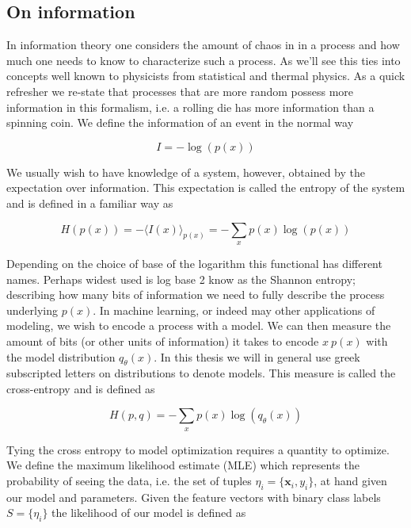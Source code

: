 \subsection{On information}\label{sec:information}

In information theory one considers the amount of chaos in in a process and how much one needs to know to characterize such a process. As we'll see this ties into concepts well known to physicists from statistical and thermal physics. As a quick refresher we re-state that processes that are more random possess more information in this formalism, i.e. a rolling die has more information than a spinning coin. We define the information of an event in the normal way 

\begin{equation}
I = -\log(p(x))
\end{equation} 

\noindent We usually wish to have knowledge of a system, however, obtained by the expectation over information. This expectation is called the entropy of the system and is defined in a familiar way as 

\begin{equation}
H(p(x)) = -\langle I(x) \rangle_{p(x)} = - \sum _x p(x)\log(p(x))
\end{equation}

\noindent Depending on the choice of base of the logarithm this functional has different names. Perhaps widest used is log base 2 know as the Shannon entropy; describing how many bits of information we need to fully describe the process underlying $p(x)$. In machine learning, or indeed may other applications of modeling, we wish to encode a process with a model. We can then measure the amount of bits (or other units of information) it takes to encode $x ~ p(x)$ with the model distribution $q_{\theta}(x)$. In this thesis we will in general use greek subscripted letters on distributions to denote models. This measure is called the cross-entropy and is defined as

\begin{equation}
H(p, q) = - \sum_x p(x)\log(q_\theta(x))
\end{equation}

\noindent Tying the cross entropy to model optimization requires a quantity to optimize. We define the maximum likelihood estimate (MLE) which represents the probability of seeing the data, i.e. the set of tuples $\eta_i = \{\mathbf{x}_i, y_i\}$, at hand given our model and parameters. Given the feature vectors with binary class labels $S = \{\eta_i\}$ the likelihood of our model is defined as 

